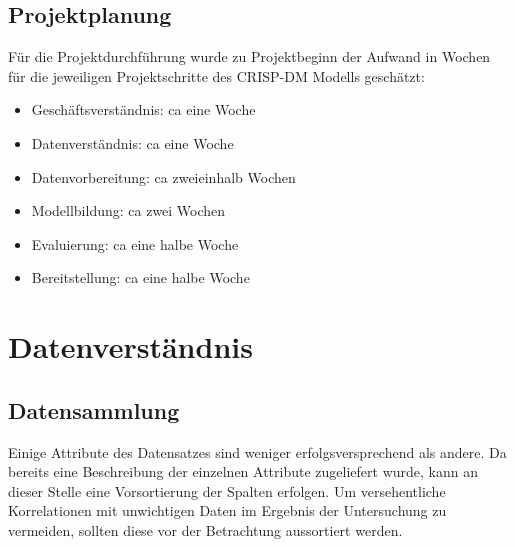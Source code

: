 \documentclass[a4paper,12pt]{article}
\begin{document}
\subsection{Projektplanung}
Für die Projektdurchführung wurde zu Projektbeginn der Aufwand in
Wochen für die jeweiligen Projektschritte des CRISP-DM Modells geschätzt:
\begin{itemize}
	\item Geschäftsverständnis: ca eine Woche
	\item Datenverständnis: ca eine Woche
	\item Datenvorbereitung: ca zweieinhalb Wochen
	\item Modellbildung: ca zwei Wochen
	\item Evaluierung: ca eine halbe Woche
	\item Bereitstellung: ca eine halbe Woche
\end{itemize}

\section{Datenverständnis}
\subsection{Datensammlung}
Einige Attribute des Datensatzes sind weniger erfolgsversprechend als andere. Da bereits eine
Beschreibung der einzelnen Attribute zugeliefert wurde, kann an dieser Stelle eine Vorsortierung
der Spalten erfolgen. Um versehentliche Korrelationen mit unwichtigen Daten im Ergebnis der
Untersuchung zu vermeiden, sollten diese vor der Betrachtung aussortiert werden.
\end{document}
